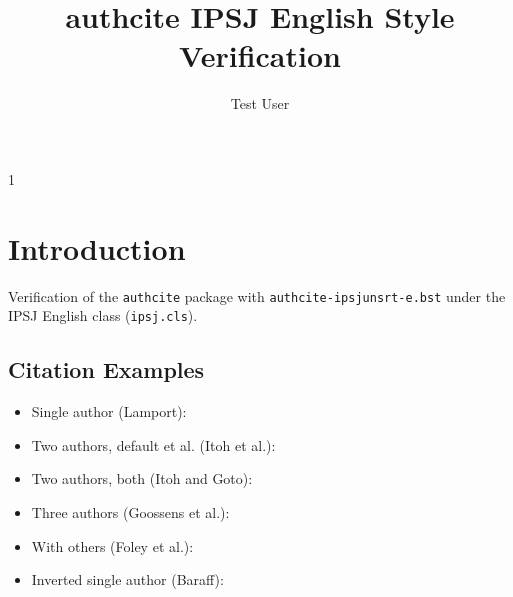 \documentclass[english,preprint,JIP]{ipsj}
\begin{document}
\title{authcite IPSJ English Style Verification}
\author{Test User}{1}
\maketitle

\section{Introduction}
Verification of the \texttt{authcite} package with \texttt{authcite-ipsjunsrt-e.bst}
under the IPSJ English class (\texttt{ipsj.cls}).

\subsection{Citation Examples}
\begin{itemize}
  \item Single author (Lamport): 
  \item Two authors, default et al. (Itoh et al.): 
  \item Two authors, both (Itoh and Goto): 
  \item Three authors (Goossens et al.): 
  \item With others (Foley et al.): 
  \item Inverted single author (Baraff): 
\end{itemize}



\end{document}
